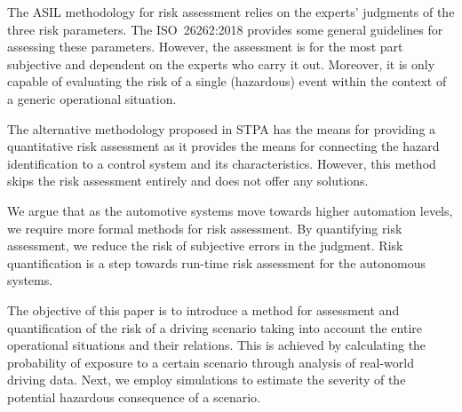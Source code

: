 The ASIL methodology for risk assessment relies on the experts’ judgments of the three risk parameters. The ISO~26262:2018 provides some general guidelines for assessing these parameters. However, the assessment is for the most part subjective and dependent on the experts who carry it out. Moreover, it is only capable of evaluating the risk of a single (hazardous) event within the context of a generic operational situation.

The alternative methodology proposed in STPA has the means for providing a quantitative risk assessment as it provides the means for connecting the hazard identification to a control system and its characteristics. However, this method skips the risk assessment entirely and does not offer any solutions. 

We argue that as the automotive systems move towards higher automation levels, we require more formal methods for risk assessment. By quantifying risk assessment, we reduce the risk of subjective errors in the judgment. Risk quantification is a step towards run-time risk assessment for the autonomous systems.  

The objective of this paper is to introduce a method for assessment and quantification of the risk of a driving scenario taking into account the entire operational situations and their relations. This is achieved by calculating the probability of exposure to a certain scenario through analysis of real-world driving data. Next, we employ simulations to estimate the severity of the potential hazardous consequence of a scenario.

